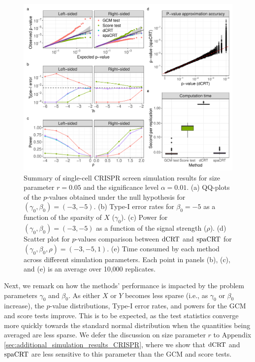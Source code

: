 \documentclass[12pt]{article}
\theoremstyle{definition}
\newcommand{\srx}{X}									%
\newcommand{\sry}{Y}									%
\newcommand{\dCRT}{\textnormal{dCRT}} 					%
\newcommand{\spacrt}{\textnormal{spaCRT}}               %
\begin{document}
  \begin{figure}[!ht]
	  \centering
	  \includegraphics[width=1.0\textwidth]{figures-and-tables/simulation/NB-regression/summary/simulation-summary.pdf}
	  \caption{\small{Summary of single-cell CRISPR screen simulation results for size parameter $r = 0.05$ and the significance level $\alpha = 0.01$. (a) QQ-plots of the $p$-values obtained under the null hypothesis for $(\gamma_0, \beta_0) = (-3, -5)$. (b) Type-I error rates for $\beta_0 = -5$ as a function of the sparsity of $\srx$ ($\gamma_0$). (c) Power for $(\gamma_0, \beta_0) = (-3, -5)$ as a function of the signal strength ($\rho$). (d) Scatter plot for $p$-values comparison between $\dCRT$ and $\spacrt$ for $(\gamma_0,\beta_0,\rho)=(-3,-5,1)$. (e) Time consumed by each method across different simulation parameters. Each point in panels (b), (c), and (e) is an average over 10,000 replicates.}}
	  \label{fig:simulation-summary}
  \end{figure}
  
  Next, we remark on how the methods' performance is impacted by the problem parameters $\gamma_0$ and $\beta_0$. As either $\srx$ or $\sry$ becomes less sparse (i.e., as $\gamma_0$ or $\beta_0$ increase), the $p$-value distributions, Type-I error rates, and powers for the GCM and score tests improve. This is to be expected, as the test statistics converge more quickly towards the standard normal distribution when the quantities being averaged are less sparse. We defer the discussion on size parameter $r$ to Appendix \ref{sec:additional_simulation_results_CRISPR}, where we show that $\dCRT$ and $\spacrt$ are less sensitive to this parameter than the GCM and score tests.
  
\end{document}
